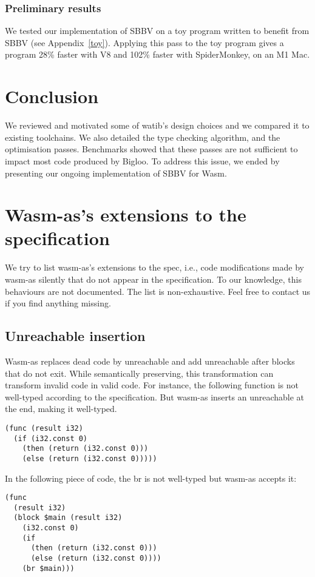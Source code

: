\documentclass[a4paper,11pt]{article}
\renewcommand{\baselinestretch}{1.05}
\begin{document}
\subsubsection{Preliminary results}
We tested our implementation of SBBV on a toy program written to benefit from
SBBV (see Appendix~\ref{toy}). Applying this pass to the toy program gives a
program 28\% faster with V8 and 102\% faster with SpiderMonkey, on an M1 Mac.

\section{Conclusion}
We reviewed and motivated some of \textsf{watib}'s design choices and we
compared it to existing toolchains. We also detailed the type checking
algorithm, and the optimisation passes. Benchmarks showed that these passes are
not sufficient to impact most code produced by Bigloo. To address this issue, we
ended by presenting our ongoing implementation of SBBV for Wasm.

\renewcommand{\baselinestretch}{1}
\printbibliography
\renewcommand{\baselinestretch}{1.05}

\newpage
\appendix
\section{Wasm-as's extensions to the specification}\label{wasmasex}
We try to list wasm-as's extensions to the spec, i.e., code modifications made by
wasm-as silently that do not appear in the specification. To our knowledge, this
behaviours are not documented. The list is non-exhaustive. Feel free to contact
us if you find anything missing.
\subsection{\textsf{Unreachable} insertion}
Wasm-as replaces dead code by \textsf{unreachable} and add
\textsf{unreachable} after blocks that do not exit. While semantically
preserving, this transformation can transform invalid code in valid code. For
instance, the following function is not well-typed according to the specification. But
wasm-as inserts an \textsf{unreachable} at the end, making it well-typed.
\begin{lstlisting}
(func (result i32)
  (if (i32.const 0)
    (then (return (i32.const 0)))
    (else (return (i32.const 0)))))
\end{lstlisting}

In the following piece of code, the \textsf{br} is not well-typed but wasm-as accepts
it:
\begin{lstlisting}
(func
  (result i32)
  (block $main (result i32)
    (i32.const 0)
    (if
      (then (return (i32.const 0)))
      (else (return (i32.const 0))))
    (br $main)))
\end{lstlisting}
\end{document}
